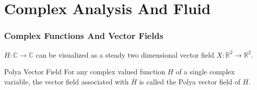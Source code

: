 \documentclass[9pt]{beamer}
\begin{document}

\section{Complex Analysis And Fluid}

\begin{frame}
  \frametitle{Complex Functions And Vector Fields}
  \begin{block}{}
    $H:\mathbb{C}\to\mathbb{C}$ can be visualized as a steady two dimensional vector field 
    $X:\mathbb{R}^2\to\mathbb{R}^2.$
  \end{block}
  \pause
  \begin{block}{Polya Vector Field}
    For any complex valued function $H$ of a single complex variable, the vector field associated with $\bar{H}$ is called the 
    Polya vector field of $H$.
  \end{block}
\end{frame}
\end{document}
